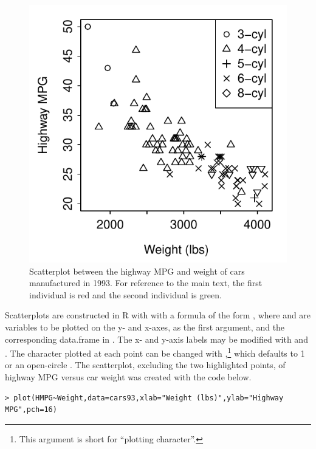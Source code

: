 \documentclass[10pt,openany]{book}\usepackage[]{graphicx}\usepackage[]{color}
\makeatletter
\newenvironment{kframe}{%
 \def\at@end@of@kframe{}%
 \ifinner\ifhmode%
  \def\at@end@of@kframe{\end{minipage}}%
  \begin{minipage}{\columnwidth}%
 \fi\fi%
 \def\FrameCommand##1{\hskip\@totalleftmargin \hskip-\fboxsep
 \colorbox{shadecolor}{##1}\hskip-\fboxsep
     \hskip-\linewidth \hskip-\@totalleftmargin \hskip\columnwidth}%
 \MakeFramed {\advance\hsize-\width
   \@totalleftmargin\z@ \linewidth\hsize
   \@setminipage}}%
 {\par\unskip\endMakeFramed%
 \at@end@of@kframe}
\newenvironment{knitrout}{}{} %
\makeatother
\begin{document}
\begin{knitrout}
\color{fgcolor}\begin{figure}[hbtp]

{\centering \includegraphics[width=.4\linewidth]{Figs/carscat2-1} 

}

\caption[Scatterplot between the highway MPG and weight of cars manufactured in 1993]{Scatterplot between the highway MPG and weight of cars manufactured in 1993. For reference to the main text, the first individual is red and the second individual is green.}\label{fig:carscat2}
\end{figure}


\end{knitrout}

Scatterplots are constructed in R with  with a formula of the form , where  and  are variables to be plotted on the y- and x-axes, as the first argument, and the corresponding data.frame in . The x- and y-axis labels may be modified with  and . The character plotted at each point can be changed with ,\footnote{This argument is short for ``plotting character''.} which defaults to 1 or an open-circle . The scatterplot, excluding the two highlighted points, of highway MPG versus car weight  was created with the code below.
\begin{knitrout}
\color{fgcolor}\begin{kframe}
\begin{verbatim}
> plot(HMPG~Weight,data=cars93,xlab="Weight (lbs)",ylab="Highway MPG",pch=16)
\end{verbatim}
\end{kframe}
\end{knitrout}
\end{document}

